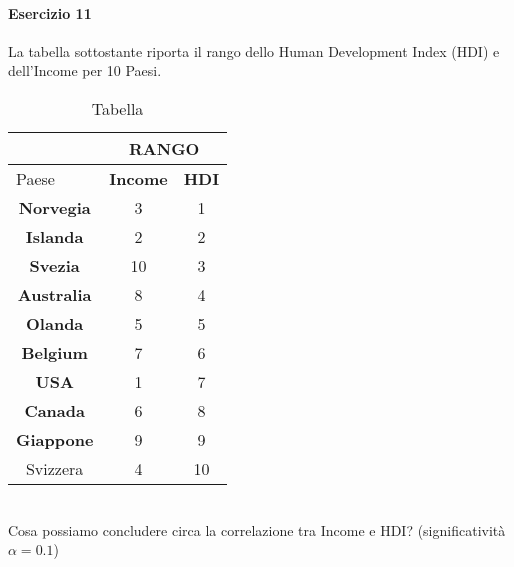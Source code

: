\documentclass[12pt]{article}
\begin{document}
    \paragraph{Esercizio 11}
    La tabella sottostante riporta il rango dello Human Development Index (HDI) e dell’Income per 10 Paesi.
    \begin{table}[!htb]
        \centering
        \begin{tabular}{c|c|c|}
        \cline{2-3}
        \multicolumn{1}{l|}{}                    & \multicolumn{2}{c|}{RANGO}     \\ \hline
        \multicolumn{1}{|l|}{Paese}              & \textbf{Income} & \textbf{HDI} \\ \hline
        \multicolumn{1}{|c|}{\textbf{Norvegia}}  & 3               & 1            \\ \hline
        \multicolumn{1}{|c|}{\textbf{Islanda}}   & 2               & 2            \\ \hline
        \multicolumn{1}{|c|}{\textbf{Svezia}}    & 10              & 3            \\ \hline
        \multicolumn{1}{|c|}{\textbf{Australia}} & 8               & 4            \\ \hline
        \multicolumn{1}{|c|}{\textbf{Olanda}}    & 5               & 5            \\ \hline
        \multicolumn{1}{|c|}{\textbf{Belgium}}   & 7               & 6            \\ \hline
        \multicolumn{1}{|c|}{\textbf{USA}}       & 1               & 7            \\ \hline
        \multicolumn{1}{|c|}{\textbf{Canada}}    & 6               & 8            \\ \hline
        \multicolumn{1}{|c|}{\textbf{Giappone}}  & 9               & 9            \\ \hline
        \multicolumn{1}{|c|}{Svizzera}           & 4               & 10           \\ \hline
        \end{tabular}
        \caption{Tabella}
        \label{tab:my-table12}
    \end{table}
    \\Cosa possiamo concludere circa la correlazione tra Income e HDI? (significatività $\alpha=0.1$)
\end{document}
